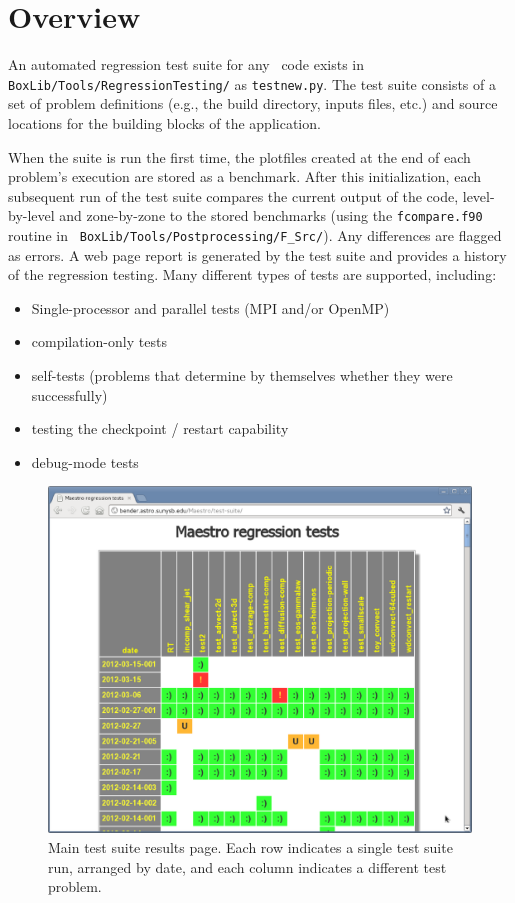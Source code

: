 \section{Overview}

An automated regression test suite for any \boxlib\ code
exists in {\tt BoxLib/Tools/RegressionTesting/} as {\tt testnew.py}.
The test suite consists of a set of problem definitions (e.g., the
build directory, inputs files, etc.) and source locations for the
building blocks of the application.

When the suite is run the first time, the plotfiles created at the end
of each problem's execution are stored as a benchmark.  After this
initialization, each subsequent run of the test suite compares the
current output of the code, level-by-level and zone-by-zone to the
stored benchmarks (using the {\tt fcompare.f90} routine in {\tt
  BoxLib/Tools/Postprocessing/F\_Src/}).  Any differences are flagged as errors.
A web page report is generated by the test suite and provides a
history of the regression testing.  Many different types of tests
are supported, including:
\begin{itemize}
\item Single-processor and parallel tests (MPI and/or OpenMP)
\item compilation-only tests
\item self-tests (problems that determine by themselves whether they were successfully)
\item testing the checkpoint / restart capability
\item debug-mode tests
\end{itemize}

\begin{figure}[t]
\centering
\includegraphics[width=5.0in]{testsuite}
\caption{\label{fig:test_suite_main} Main test suite results page.  Each 
row indicates a single test suite run, arranged by date, and each column
indicates a different test problem. }
\end{figure}

